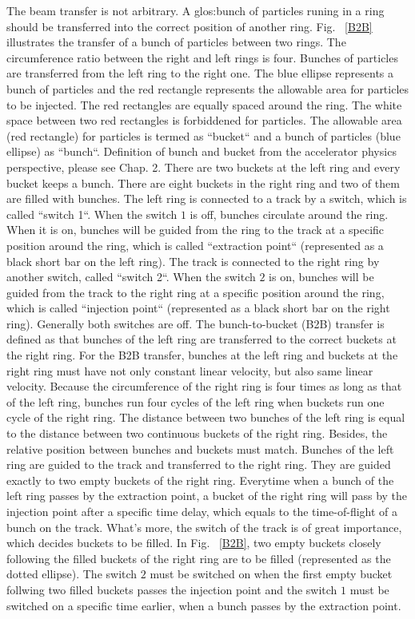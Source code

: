 The beam transfer is not arbitrary. A \gls{glos:bunch} of particles runing in a ring should be transferred into the correct position of another ring. Fig. ~\ref{B2B} illustrates the transfer of a bunch of particles between two rings. The circumference ratio between the right and left rings is four. Bunches of particles are transferred from the left ring to the right one. The blue ellipse represents a bunch of particles and the red rectangle represents the allowable area for particles to be injected. The red rectangles are equally spaced around the ring. The white space between two red rectangles is forbiddened for particles. The allowable area (red rectangle) for particles is termed as ``bucket`` and a bunch of particles (blue ellipse) as ``bunch``. Definition of bunch and bucket from the accelerator physics perspective, please see Chap. 2. There are two buckets at the left ring and every bucket keeps a bunch. There are eight buckets in the right ring and two of them are filled with bunches. The left ring is connected to a track by a switch, which is called ``switch 1``. When the switch $1$ is off, bunches circulate around the ring. When it is on, bunches will be guided from the ring to the track at a specific position around the ring, which is called ``extraction point`` (represented as a black short bar on the left ring). The track is connected to the right ring by another switch, called ``switch 2``. When the switch $2$ is on, bunches will be guided from the track to the right ring at a specific position around the ring, which is called ``injection point`` (represented as a black short bar on the right ring). Generally both switches are off. The bunch-to-bucket (B2B) transfer is defined as that bunches of the left ring are transferred to the correct buckets at the right ring. For the B2B transfer, bunches at the left ring and buckets at the right ring must have not only constant linear velocity, but also same linear velocity. Because the circumference of the right ring is four times as long as that of the left ring, bunches run four cycles of the left ring when buckets run one cycle of the right ring. The distance between two bunches of the left ring is equal to the distance between two continuous buckets of the right ring. Besides, the relative position between bunches and buckets must match. Bunches of the left ring are guided to the track and transferred to the right ring. They are guided exactly to two empty buckets of the right ring. Everytime when a bunch of the left ring passes by the extraction point, a bucket of the right ring will pass by the injection point after a specific time delay, which equals to the time-of-flight of a bunch on the track. What's more, the switch of the track is of great importance, which decides buckets to be filled. In Fig. ~\ref{B2B}, two empty buckets closely following the filled buckets of the right ring are to be filled (represented as the dotted ellipse). The switch $2$ must be switched on when the first empty bucket follwing two filled buckets passes the injection point and the switch $1$ must be switched on a specific time earlier, when a bunch passes by the extraction point. 

